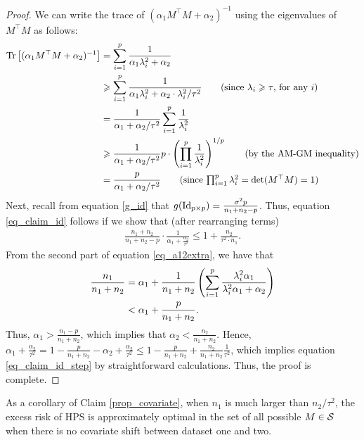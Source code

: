 \begin{proof}
    We can write the trace of $(\alpha_1 M^{\top} M + \alpha_2)^{-1}$ using the eigenvalues of $M^{\top} M$ as follows:
    \begin{align*}
        \bigtr{(\alpha_1 M^{\top} M + \alpha_2)^{-1}} &= \sum_{i=1}^p \frac{1} {\alpha_1 \lambda_i^2 + \alpha_2} \\
        &\ge \sum_{i=1}^p \frac{1} {\alpha_1 \lambda_i^2 + \alpha_2 \cdot {\lambda_i^2} / {\tau^2}} \tag{since $\lambda_i \ge \tau$, for any $i$} \\
        &= \frac 1 {\alpha_1 + \alpha_2 / \tau^2} \sum_{i=1}^ p \frac 1 {\lambda_i^2} \\
        &\ge \frac 1 {\alpha_1 + \alpha_2 /\tau^2} p\cdot \bigbrace{\prod_{i=1}^p \frac 1 {\lambda_i^2}}^{1/ p} \tag{by the AM-GM inequality} \\
        &= \frac{p}{\alpha_1 + \alpha_2 / \tau^2} \tag{since $\prod_{i=1}^p \lambda_i^2 = \det(M^{\top} M) = 1$}
    \end{align*}
    Next, recall from equation \eqref{g_id} that
    $g(\operatorname{Id}_{p\times p}) = \frac{\sigma^2 p}{n_1 + n_2 - p}$.
    Thus, equation \eqref{eq_claim_id} follows if we show that (after rearranging terms)
    \begin{align}
        \frac{n_1 + n_2}{n_1 + n_2 - p} \cdot \frac 1 {\alpha_1 + \frac{\alpha_2}{\tau^2}} \le 1 + \frac{n_2}{\tau^2 \cdot n_1}. \label{eq_claim_id_step}
    \end{align}
    From the second part of equation \eqref{eq_a12extra}, we have that
    \begin{align*}
        \frac{n_1} {n_1 + n_2} &= \alpha_1 + \frac 1 {n_1 + n_2} \bigbrace{\sum_{i=1}^p \frac{\lambda_i^2\alpha_1}{\lambda_i^2\alpha_1 + \alpha_2}} \\
        &< \alpha_1 + \frac p {n_1 + n_2}.
    \end{align*}
    Thus, $\alpha_1 > \frac{n_1 - p}{n_1 + n_2}$, which implies that $\alpha_2 < \frac{n_2}{n_1 + n_2}$.
    Hence, $\alpha_1 + \frac{\alpha_2}{\tau^2} = 1 - \frac{p}{n_1 + n_2} - \alpha_2 + \frac{\alpha_2}{\tau^2} \le 1 - \frac{p}{n_1 + n_2} + \frac{n_2}{n_1 + n_2} \frac 1 {\tau^2}$, which implies
    equation \eqref{eq_claim_id_step} by straightforward calculations.
    Thus, the proof is complete.
\end{proof}
As a corollary of Claim \ref{prop_covariate}, when $n_1$ is much larger than $n_2 / \tau^2$, the excess risk of HPS is approximately optimal in the set of all possible $M\in\mathcal{S}$ when there is no covariate shift between dataset one and two.





